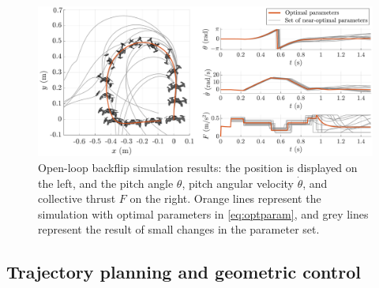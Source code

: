\begin{figure}[!h]
\centering
\includegraphics[width=\linewidth]{Fig/opensimu2.pdf}
\caption[Open-loop backflip simulation results]{Open-loop backflip simulation results: the position is displayed on the left, and the pitch angle $\theta$, pitch angular velocity $\dot{\theta}$, and collective thrust $F$ on the right. Orange lines represent the simulation with optimal parameters in \eqref{eq:optparam}, and grey lines represent the result of small changes in the parameter set.}\label{fig:opensimu}
\end{figure}




\pagebreak
\subsection{Trajectory planning and geometric control}

